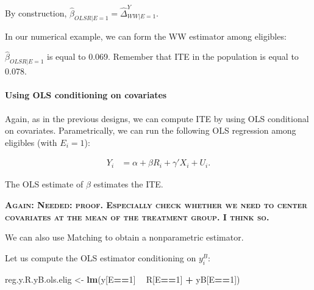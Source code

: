 \documentclass[]{book}
\newenvironment{Shaded}{\begin{snugshade}}{\end{snugshade}}
\newcommand{\DecValTok}[1]{\textcolor[rgb]{0.00,0.00,0.81}{#1}}
\newcommand{\KeywordTok}[1]{\textcolor[rgb]{0.13,0.29,0.53}{\textbf{#1}}}
\newcommand{\NormalTok}[1]{#1}
\newcommand{\OperatorTok}[1]{\textcolor[rgb]{0.81,0.36,0.00}{\textbf{#1}}}
\newcommand{\StringTok}[1]{\textcolor[rgb]{0.31,0.60,0.02}{#1}}
\let\oldparagraph\paragraph
\renewcommand{\paragraph}[1]{\oldparagraph{#1}\mbox{}}
\theoremstyle{definition}
\theoremstyle{definition}
\theoremstyle{definition}
\theoremstyle{remark}
\let\BeginKnitrBlock\begin \let\EndKnitrBlock\end
\begin{document}
By construction, \(\hat{\beta}_{OLSR|E=1}=\hat{\Delta}^Y_{WW|E=1}\).

\BeginKnitrBlock{example}
\protect\hypertarget{exm:unnamed-chunk-95}{}{\label{exm:unnamed-chunk-95} }In our numerical example, we can form the WW estimator among eligibles:
\EndKnitrBlock{example}

\begin{Shaded}
\end{Shaded}

\(\hat{\beta}_{OLSR|E=1}\) is equal to 0.069.
Remember that ITE in the population is equal to 0.078.

\hypertarget{using-ols-conditioning-on-covariates-2}{%
\paragraph{Using OLS conditioning on covariates}\label{using-ols-conditioning-on-covariates-2}}

Again, as in the previous designs, we can compute ITE by using OLS conditional on covariates.
Parametrically, we can run the following OLS regression among eligibles (with \(E_i=1\)):

\begin{align*}
    Y_i &  = \alpha +  \beta R_i + \gamma' X_i + U_i.
  \end{align*}

The OLS estimate of \(\beta\) estimates the ITE.

\textbf{\textsc{Again: Needed: proof. Especially check whether we need to center covariates at the mean of the treatment group. I think so.}}

We can also use Matching to obtain a nonparametric estimator.

\BeginKnitrBlock{example}
\protect\hypertarget{exm:unnamed-chunk-96}{}{\label{exm:unnamed-chunk-96} }Let us compute the OLS estimator conditioning on \(y_i^B\):
\EndKnitrBlock{example}

\begin{Shaded}
\begin{Highlighting}[]
\NormalTok{reg.y.R.yB.ols.elig <-}\StringTok{ }\KeywordTok{lm}\NormalTok{(y[E}\OperatorTok{==}\DecValTok{1}\NormalTok{] }\OperatorTok{~}\StringTok{ }\NormalTok{R[E}\OperatorTok{==}\DecValTok{1}\NormalTok{] }\OperatorTok{+}\StringTok{ }\NormalTok{yB[E}\OperatorTok{==}\DecValTok{1}\NormalTok{])}
\end{Highlighting}
\end{Shaded}
\end{document}
